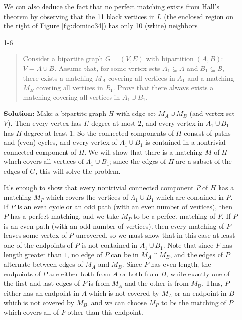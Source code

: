 \documentclass[12pt]{article}
\begin{document}
\begin{enumerate}
We can also deduce the fact that no perfect matching exists from
Hall's theorem by observing that the 11 black vertices in $L$ (the
enclosed region on the right of Figure \ref{fig:domino34}) has only 10
(white) neighbors.



\item[1-6]
\begin{quote}
Consider a bipartite graph $G=(V,E)$ with bipartition $(A,B)$: $V=A
\cup B$. Assume that, for some vertex sets $A_1\subseteq A$ and $B_1
\subseteq B$, there exists a matching $M_A$ covering all vertices in
$A_1$ and a matching $M_B$ covering all vertices in $B_1$. Prove that
there always exists a matching covering all vertices in $A_1\cup
B_1$.
\end{quote}

\textbf{Solution: }
Make a bipartite graph $H$ with edge set $M_A \cup M_B$ (and vertex set $V$). Then every vertex has $H$-degree at most $2$, and every vertex in $A_1 \cup B_1$ has $H$-degree at least $1$. So the connected components of $H$ consist of paths and (even) cycles, and every vertex of $A_1\cup B_1$ is contained in a nontrivial connected component of $H$. We will show that there is a matching $M$ of $H$ which covers all vertices of $A_1 \cup B_1$; since the edges of $H$ are a subset of the edges of $G$, this will solve the problem.

It's enough to show that every nontrivial connected component $P$ of $H$ has a matching $M_P$ which covers the vertices of $A_1\cup B_1$ which are contained in $P$. If $P$ is an even cycle or an odd path (with an even number of vertices), then $P$ has a perfect matching, and we take $M_P$ to be a perfect matching of $P$. If $P$ is an even path (with an odd number of vertices), then every matching of $P$ leaves some vertex of $P$ uncovered, so we must show that in this case at least one of the endpoints of $P$ is not contained in $A_1\cup B_1$. Note that since $P$ has length greater than $1$, no edge of $P$ can be in $M_A \cap M_B$, and the edges of $P$ alternate between edges of $M_A$ and $M_B$. Since $P$ has even length, the endpoints of $P$ are either both from $A$ or both from $B$, while exactly one of the first and last edges of $P$ is from $M_A$ and the other is from $M_B$. Thus, $P$ either has an endpoint in $A$ which is not covered by $M_A$ or an endpoint in $B$ which is not covered by $M_B$, and we can choose $M_P$ to be the matching of $P$ which covers all of $P$ other than this endpoint.


\end{enumerate}
\end{document}

